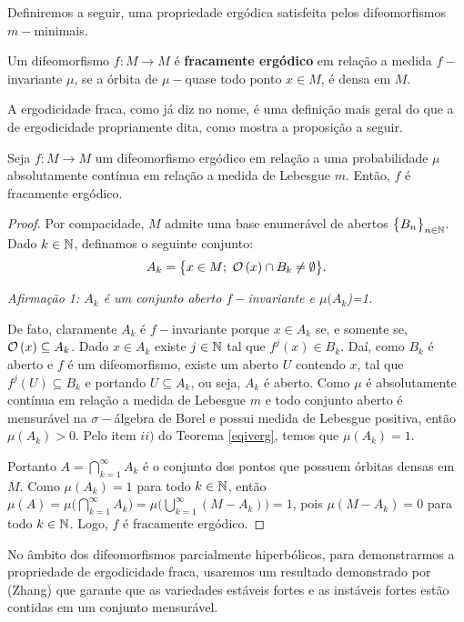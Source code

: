 Definiremos a seguir, uma propriedade ergódica satisfeita pelos difeomorfismos $m-$mi\-ni\-mais.

\begin{definicao} Um difeomorfismo $f:M\to M$ é \textbf{fracamente ergódico} em relação a medida $f-$invariante $\mu$, se a órbita de $\mu-$quase todo ponto $x\in M$, é densa em $M$.
\end{definicao}

A ergodicidade fraca, como já diz no nome, é uma definição mais geral do que a de ergodicidade propriamente dita, como mostra a proposição a seguir.

\begin{proposicao} Seja $f:M\to M$ um difeomorfismo ergódico em relação a uma probabilidade $\mu$ absolutamente contínua em relação a medida de Lebesgue $m$. Então, $f$ é fracamente ergódico.
\end{proposicao}

\begin{proof} Por compacidade, $M$ admite uma base enumerável de abertos $\big\{B_n\big\}_{n\in\mathbb{N}}$. Dado $k\in \mathbb{N}$, definamos o seguinte conjunto: $$A_k=\big\{x\in M;\ \mathcal{O}\left(x\right)\cap B_k\neq\emptyset\big\}.$$ 

\textit{Afirmação 1: $A_k$ é um conjunto aberto $f-$invariante e $\mu(A_k$)=1.}

De fato, claramente $A_k$ é $f-$invariante porque $x\in A_k$ se, e somente se, $\mathcal{O}\left(x\right)\subseteq A_k$. Dado $x\in A_k$ existe $j\in\mathbb{N}$ tal que $f^j(x)\in B_k$. Daí, como $B_k$ é aberto e $f$ é um difeomorfismo, existe um aberto $U$ contendo $x$, tal que $f^j(U)\subseteq B_k$ e portando $U\subseteq A_k$, ou seja, $A_k$ é aberto. Como $\mu$ é absolutamente contínua em relação a medida de Lebesgue $m$ e todo conjunto aberto é mensurável na $\sigma-$álgebra de Borel e possui medida de Lebesgue positiva, então $\mu(A_k)>0$. Pelo item $ii)$ do Teorema \ref{eqiverg}, temos que $\mu(A_k)=1$.

Portanto $A=\bigcap_{k=1}^{\infty}A_k$ é o conjunto dos pontos que possuem órbitas densas em $M$. Como $\mu(A_k)=1$ para todo $k\in\mathbb{N}$, então $\mu(A)=\mu\big(\bigcap_{k=1}^{\infty}A_k\big)=\mu\big(\bigcup_{k=1}^{\infty} (M-A_k)\big)=1$, pois $\mu(M-A_k)=0$ para todo $k\in\mathbb{N}$. Logo, $f$ é fracamente ergódico.
\end{proof}

No âmbito dos difeomorfismos parcialmente hiperbólicos, para demonstrarmos a propriedade de ergodicidade fraca, usaremos um resultado demonstrado por (Zhang\cite{zang}) que garante que as variedades estáveis fortes e as instáveis fortes estão contidas em um conjunto mensurável.

